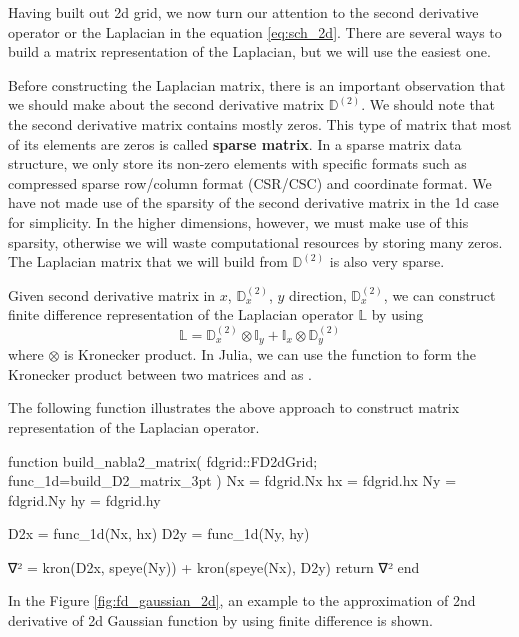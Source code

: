 Having built out 2d grid, we now turn our attention to the second derivative operator or
the Laplacian in the equation \ref{eq:sch_2d}.
There are several ways to build a matrix representation of the Laplacian, but we will
use the easiest one. 

Before constructing the Laplacian matrix, there is an important observation that
we should make about the second derivative matrix $\mathbb{D}^{(2)}$. We should note
that the second derivative matrix contains mostly zeros. This type of matrix that
most of its elements are zeros is called \textbf{sparse matrix}.
In a sparse matrix data structure, we only store its non-zero elements with specific
formats such as compressed sparse row/column format (CSR/CSC) and coordinate format.
We have not made use of the sparsity of the second derivative matrix
in the 1d case for simplicity. In the higher dimensions, however,
we must make use of this sparsity, otherwise we will waste computational resources 
by storing many zeros. The Laplacian matrix that we will build from
$\mathbb{D}^{(2)}$ is also very sparse.

Given second derivative matrix in $x$, $\mathbb{D}^{(2)}_{x}$,
$y$ direction, $\mathbb{D}^{(2)}_{x}$,
we can construct finite difference representation of the Laplacian operator
$\mathbb{L}$ by using
%
\begin{equation}
\mathbb{L} = \mathbb{D}^{(2)}_{x} \otimes \mathbb{I}_{y} +
\mathbb{I}_{x} \otimes \mathbb{D}^{(2)}_{y}
\end{equation}
%
where $\otimes$ is Kronecker product.
In Julia, we can use the function  to form the Kronecker product
between two matrices  and  as .

The following function illustrates the above approach to construct matrix
representation of the Laplacian operator.
\begin{juliacode}
function build_nabla2_matrix( fdgrid::FD2dGrid; func_1d=build_D2_matrix_3pt )
    Nx = fdgrid.Nx
    hx = fdgrid.hx
    Ny = fdgrid.Ny
    hy = fdgrid.hy
    
    D2x = func_1d(Nx, hx)
    D2y = func_1d(Ny, hy)

    ∇² = kron(D2x, speye(Ny)) + kron(speye(Nx), D2y)
    return ∇²
end
\end{juliacode}

In the Figure \ref{fig:fd_gaussian_2d}, an example to the approximation of 2nd derivative
of 2d Gaussian function by using finite difference is shown.


